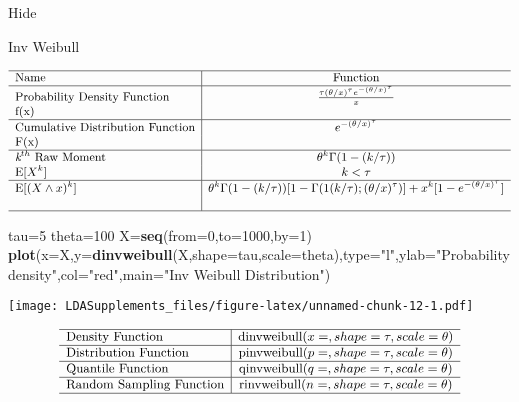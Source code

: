 \documentclass[]{book}
\newenvironment{Shaded}{\begin{snugshade}}{\end{snugshade}}
\newcommand{\KeywordTok}[1]{\textcolor[rgb]{0.13,0.29,0.53}{\textbf{#1}}}
\newcommand{\DataTypeTok}[1]{\textcolor[rgb]{0.13,0.29,0.53}{#1}}
\newcommand{\DecValTok}[1]{\textcolor[rgb]{0.00,0.00,0.81}{#1}}
\newcommand{\StringTok}[1]{\textcolor[rgb]{0.31,0.60,0.02}{#1}}
\newcommand{\NormalTok}[1]{#1}
\begin{document}
\hypertarget{2pH}{}
{Hide}

Inv Weibull

\[
{\small
\begin{matrix}
\begin{array}{l|c}
\hline
  \text{Name} & \text{Function} \\
\hline
  \text{Probability Density Function} & \frac{\tau(\theta/x)^\tau e^{-(\theta/x)^\tau}}{x} \\
    \text{f(x)} & \\
\hline
  \text{Cumulative Distribution Function} & e^{-(\theta/x)^\tau} \\
    \text{F(x)} & \\
\hline
 \textit{k}^{th}~\text{Raw Moment} & \theta^k\Gamma(1-(k/\tau)) \\
  \mathrm{E}[X^k]  & k<\tau \\
\hline
  \mathrm{E}[(X\wedge x)^k] & \theta^k\Gamma(1-(k/\tau))[1-\Gamma(1(k/\tau);(\theta/x)^\tau)]+x^k[1-e^{-(\theta/x)^\tau}] \\
  &  \\
\hline
\end{array}
\end{matrix}
}
\]

\begin{Shaded}
\begin{Highlighting}[]
\NormalTok{tau=}\DecValTok{5}
\NormalTok{theta=}\DecValTok{100}
\NormalTok{X=}\KeywordTok{seq}\NormalTok{(}\DataTypeTok{from=}\DecValTok{0}\NormalTok{,}\DataTypeTok{to=}\DecValTok{1000}\NormalTok{,}\DataTypeTok{by=}\DecValTok{1}\NormalTok{)}
\KeywordTok{plot}\NormalTok{(}\DataTypeTok{x=}\NormalTok{X,}\DataTypeTok{y=}\KeywordTok{dinvweibull}\NormalTok{(X,}\DataTypeTok{shape=}\NormalTok{tau,}\DataTypeTok{scale=}\NormalTok{theta),}\DataTypeTok{type=}\StringTok{"l"}\NormalTok{,}\DataTypeTok{ylab=}\StringTok{"Probability density"}\NormalTok{,}\DataTypeTok{col=}\StringTok{"red"}\NormalTok{,}\DataTypeTok{main=}\StringTok{"Inv Weibull Distribution"}\NormalTok{)}
\end{Highlighting}
\end{Shaded}

\texttt{[image: LDASupplements\_files/figure-latex/unnamed-chunk-12-1.pdf]}

\[
{\small
\begin{matrix}
\begin{array}{l|c}
\hline
  \text{Density Function} & \text{dinvweibull}(x=, shape=\tau, scale=\theta) \\
\hline
  \text{Distribution Function} & \text{pinvweibull}(p=, shape=\tau,scale=\theta) \\
\hline
  \text{Quantile Function} & \text{qinvweibull}(q=, shape=\tau,scale=\theta) \\ 
\hline
  \text{Random Sampling Function} & \text{rinvweibull}(n=, shape=\tau,scale=\theta) \\
\hline
\end{array}
\end{matrix}
}
\]
\end{document}
